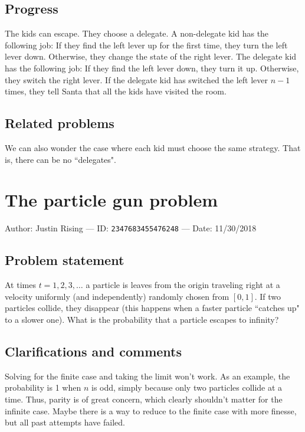 \documentclass[10pt]{article}
\begin{document}
\subsection{Progress}

The kids can escape. They choose a delegate. A non-delegate kid has the following job: If they find the left lever up for the first time, they turn the left lever down. Otherwise, they change the state of the right lever. The delegate kid has the following job: If they find the left lever down, they turn it up. Otherwise, they switch the right lever. If the delegate kid has switched the left lever $n-1$ times, they tell Santa that all the kids have visited the room.

\subsection{Related problems}

We can also wonder the case where each kid must choose the same strategy. That is, there can be no ``delegates".

\pagebreak

\section{The particle gun problem}

Author: Justin Rising --- ID: \verb`2347683455476248` --- Date: 11/30/2018

\subsection{Problem statement}

At times $t=1,2,3,\ldots$ a particle is leaves from the origin traveling right at a velocity uniformly (and independently) randomly chosen from $[0,1]$. If two particles collide, they disappear (this happens when a faster particle ``catches up" to a slower one). What is the probability that a particle escapes to infinity?

\subsection{Clarifications and comments}

Solving for the finite case and taking the limit won't work. As an example, the probability is 1 when $n$ is odd, simply because only two particles collide at a time. Thus, parity is of great concern, which clearly shouldn't matter for the infinite case. Maybe there is a way to reduce to the finite case with more finesse, but all past attempts have failed.
\end{document}
